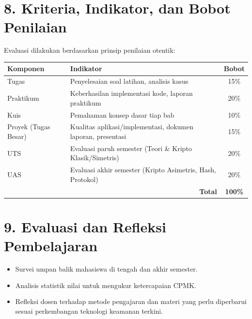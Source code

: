 \documentclass[12pt,a4paper]{article}
\begin{document}
\vspace{0.5cm}

\section*{8. Kriteria, Indikator, dan Bobot Penilaian}

Evaluasi dilakukan berdasarkan prinsip penilaian otentik:

\begin{longtable}{|p{3cm}|p{5cm}|c|}
\hline
\textbf{Komponen} & \textbf{Indikator} & \textbf{Bobot} \\
\hline
Tugas & Penyelesaian soal latihan, analisis kasus & 15\% \\
\hline
Praktikum & Keberhasilan implementasi kode, laporan praktikum & 20\% \\
\hline
Kuis & Pemahaman konsep dasar tiap bab & 10\% \\
\hline
Proyek (Tugas Besar) & Kualitas aplikasi/implementasi, dokumen laporan, presentasi & 15\% \\
\hline
UTS & Evaluasi paruh semester (Teori \& Kripto Klasik/Simetris) & 20\% \\
\hline
UAS & Evaluasi akhir semester (Kripto Asimetris, Hash, Protokol) & 20\% \\
\hline
\multicolumn{2}{|r|}{\textbf{Total}} & \textbf{100\%} \\
\hline
\end{longtable}

\vspace{0.5cm}

\section*{9. Evaluasi dan Refleksi Pembelajaran}
\begin{itemize}[leftmargin=*]
    \item Survei umpan balik mahasiswa di tengah dan akhir semester.
    \item Analisis statistik nilai untuk mengukur ketercapaian CPMK.
    \item Refleksi dosen terhadap metode pengajaran dan materi yang perlu diperbarui sesuai perkembangan teknologi keamanan terkini.
\end{itemize}
\end{document}
